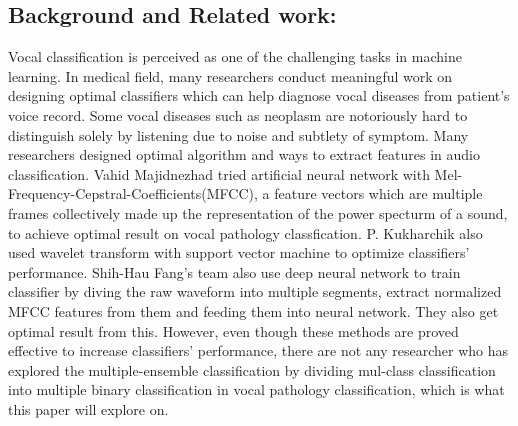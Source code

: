 \subsection{Background and Related work:}
	Vocal classification is perceived as one of the challenging tasks in machine learning. In medical field, many researchers conduct meaningful work on designing optimal classifiers which can help diagnose vocal diseases from patient's voice record. Some vocal diseases such as neoplasm are notoriously hard to distinguish solely by listening due to noise and subtlety of symptom. 
	Many researchers designed optimal algorithm and ways to extract features in audio classification.
	Vahid Majidnezhad tried artificial neural network with Mel-Frequency-Cepstral-Coefficients(MFCC), a feature vectors which are multiple frames collectively made up the representation of the power specturm of a sound, to achieve optimal result on vocal pathology classfication\cite{b5}. P. Kukharchik also used wavelet transform with support vector machine to optimize classifiers' performance\cite{b4}. Shih-Hau Fang's team also use deep neural network to train classifier by diving the raw waveform into multiple segments, extract normalized MFCC features from them and feeding them into neural network. They also get optimal result from this\cite{b9}.
	However, even though these methods are proved effective to increase classifiers' performance, there are not any researcher who has explored the multiple-ensemble classification by dividing mul-class classification into multiple binary classification in vocal pathology classification, which is what this paper will explore on. 

	